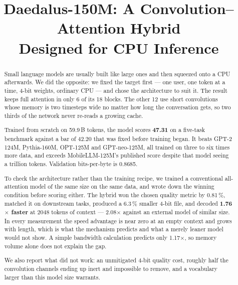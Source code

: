 \documentclass[conference]{IEEEtran}
\begin{document}
\title{Daedalus-150M: A Convolution--Attention Hybrid\\
Designed for CPU Inference}

\author{
}

\maketitle

\begin{abstract}
Small language models are usually built like large ones and then squeezed onto a
CPU afterwards. We did the opposite: we fixed the target first --- one user, one
token at a time, 4-bit weights, ordinary CPU --- and chose the architecture to
suit it. The result keeps full attention in only 6 of its 18 blocks. The other
12 use short convolutions whose memory is two timesteps wide no matter how long
the conversation gets, so two thirds of the network never re-reads a growing
cache.

Trained from scratch on 59.9\,B tokens, the model scores \textbf{47.31} on a
five-task benchmark against a bar of 42.20 that was fixed before training began.
It beats GPT-2 124M, Pythia-160M, OPT-125M and GPT-neo-125M, all trained on
three to six times more data, and exceeds MobileLLM-125M's published score
despite that model seeing a trillion tokens. Validation bits-per-byte is 0.8685.

To check the architecture rather than the training recipe, we trained a
conventional all-attention model of the same size on the same data, and wrote
down the winning condition before scoring either. The hybrid won the chosen
quality metric by 0.81\,\%, matched it on downstream tasks, produced a 6.3\,\%
smaller 4-bit file, and decoded \textbf{1.76$\times$ faster} at 2048 tokens of
context --- 2.08$\times$ against an external model of similar size. In every
measurement the speed advantage is near zero at an empty context and grows with
length, which is what the mechanism predicts and what a merely leaner model
would not show. A simple bandwidth calculation predicts only 1.17$\times$, so
memory volume alone does not explain the gap.

We also report what did not work: an unmitigated 4-bit quality cost, roughly
half the convolution channels ending up inert and impossible to remove, and a
vocabulary larger than this model size warrants.
\end{abstract}
\end{document}
